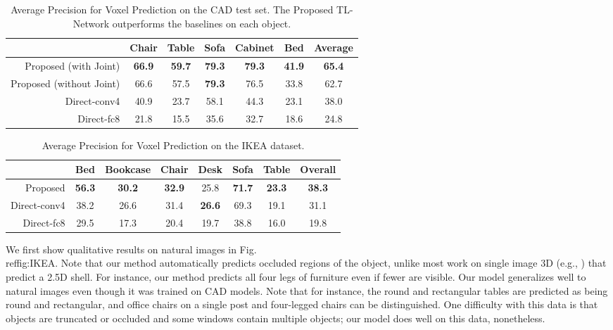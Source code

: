 \documentclass[runningheads]{llncs}
\begin{document}
\begin{table}[t]
\centering
\caption{Average Precision for Voxel Prediction on the CAD test set. The Proposed
TL-Network outperforms the baselines on each object.}
\label{tab:CAD}
\begin{tabular}{r@{~~~}ccccc@{~~~~}c} \toprule
                          & Chair     & Table     & Sofa      & Cabinet   & Bed       & Average   \\ \midrule
Proposed (with Joint)     & \bf 66.9  & \bf 59.7  & \bf 79.3  & \bf 79.3  & \bf 41.9  & \bf 65.4  \\
Proposed (without Joint)  & 66.6      & 57.5      & \bf 79.3  & 76.5      & 33.8      & 62.7      \\
Direct-conv4              & 40.9      & 23.7      & 58.1      & 44.3      & 23.1      & 38.0      \\ 
Direct-fc8                & 21.8      & 15.5      & 35.6      & 32.7      & 18.6      & 24.8      \\ \bottomrule
\end{tabular}
\end{table}\begin{table}[t]
\centering
\caption{Average Precision for Voxel Prediction on the IKEA dataset.}
\label{tab:ikea-quant}
\begin{tabular}{r@{~~~}cccccc@{~~~~}c} \toprule
                & Bed       & Bookcase  & Chair     & Desk      & Sofa      & Table         & Overall       \\ \midrule
Proposed        & \bf 56.3  & \bf 30.2  & \bf 32.9  & 25.8      & \bf 71.7  & \bf 23.3      & \bf 38.3      \\
Direct-conv4    & 38.2      & 26.6      & 31.4      & \bf 26.6  & 69.3      & 19.1          & 31.1          \\
Direct-fc8      & 29.5      & 17.3      & 20.4      & 19.7      & 38.8      & 16.0          & 19.8          \\ \bottomrule
\end{tabular}
\end{table} We first show qualitative results on natural images
in Fig.\\ref{fig:IKEA}. Note that our method automatically predicts occluded
regions of the object, unlike most work on single image 3D (e.g.,
\cite{Saxena08,Hoiem-IJCV07,Eigen14,Eigen15,Fouhey13a,Wang15a}) that predict a
2.5D shell. For instance, our method predicts all four legs of 
furniture even if fewer are visible.  
Our model generalizes well to natural images even though 
it was trained on CAD models. Note that for instance, the round and
rectangular tables are predicted as being round and rectangular, and 
office chairs on a single post and four-legged chairs can be distinguished. One difficulty
with this data is that objects are truncated or occluded and some windows
contain multiple objects; our model does well on this data, nonetheless.
\end{document}
